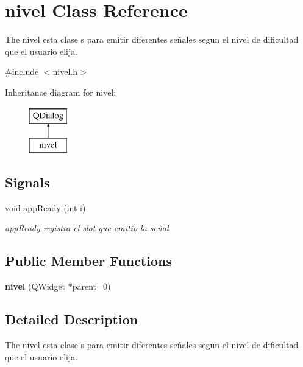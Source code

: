 \hypertarget{classnivel}{\section{nivel Class Reference}
\label{classnivel}
}


The nivel esta clase s para emitir diferentes señales segun el nivel de dificultad que el usuario elija.  




{\ttfamily \#include $<$nivel.\-h$>$}

Inheritance diagram for nivel\-:\begin{figure}[H]
\begin{center}
\leavevmode
\includegraphics[height=2.000000cm]{classnivel}
\end{center}
\end{figure}
\subsection*{Signals}
\begin{DoxyCompactItemize}
\item 
void \hyperlink{classnivel_a8a46a97c07c0cc03939e26108e9ffb80}{app\-Ready} (int i)
\begin{DoxyCompactList}\small\item\em app\-Ready registra el slot que emitio la señal \end{DoxyCompactList}\end{DoxyCompactItemize}
\subsection*{Public Member Functions}
\begin{DoxyCompactItemize}
\item 
\hypertarget{classnivel_add84530f153521109b3c306edf61db1d}{{\bfseries nivel} (Q\-Widget $\ast$parent=0)}\label{classnivel_add84530f153521109b3c306edf61db1d}

\end{DoxyCompactItemize}


\subsection{Detailed Description}
The nivel esta clase s para emitir diferentes señales segun el nivel de dificultad que el usuario elija. 

